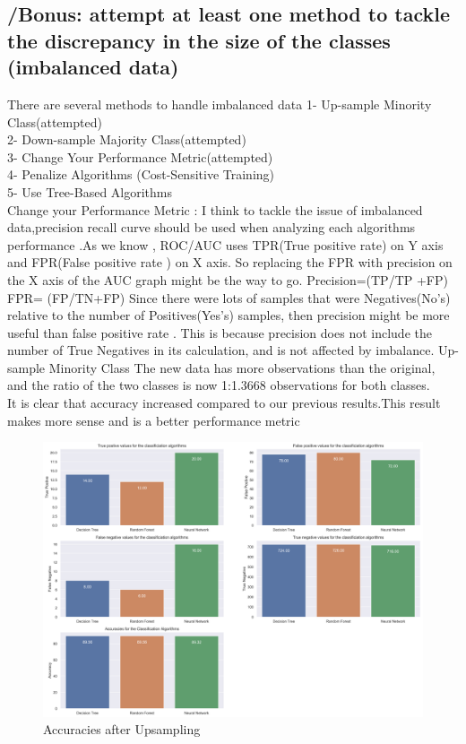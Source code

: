 \subsection{ /Bonus: attempt at least one method to tackle the discrepancy in the size of the classes (imbalanced data)}
There are several methods to handle imbalanced data\cite{ref_url2}
1- Up-sample Minority Class(attempted)\\
2- Down-sample Majority Class(attempted)\\
3- Change Your Performance Metric(attempted)\\
4- Penalize Algorithms (Cost-Sensitive Training)\\
5- Use Tree-Based Algorithms\\
Change your Performance Metric :
 I think to tackle the issue of imbalanced data,precision  recall curve should be used when analyzing each algorithms performance  .As we know , ROC/AUC uses TPR(True positive rate) on Y axis and FPR(False positive rate ) on X axis. So replacing the FPR with precision on the X axis of the AUC graph might be the way to go.
 Precision=(TP/TP +FP) FPR= (FP/TN+FP)
 Since there were lots of samples that were Negatives(No's) relative to the number of Positives(Yes's) samples, then precision might be more useful than false positive rate . This is because precision does not include the number of True Negatives in its calculation, and is not affected by imbalance.
Up-sample Minority Class
The new data has more observations than the original, and the ratio of the two classes is now 1:1.3668 observations for both classes.\\
It is clear that accuracy increased compared to our previous results.This result makes more sense and is a better performance metric
\begin{figure}[!ht]
 \centering
\includegraphics[width=5.1in]{assignment2/barcharts_algorithms.png}
\caption{\label{fig:fig5}Accuracies after Upsampling }
\end{figure}
